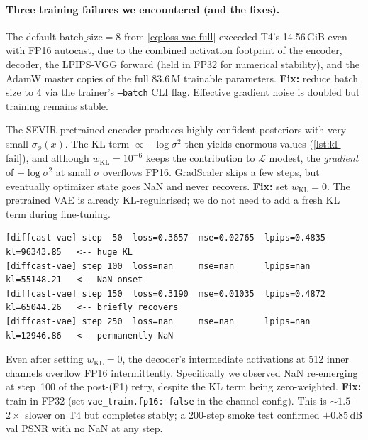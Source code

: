 \documentclass[11pt,a4paper]{article}
\begin{document}
\paragraph{Three training failures we encountered (and the fixes).}

\begin{description}[leftmargin=*]
\item[(F0) Out-of-memory on T4 at batch size 8.]  The default
  $\mathrm{batch\_size}=8$ from \cref{eq:loss-vae-full} exceeded T4's
  14.56\,GiB even with FP16 autocast, due to the combined activation
  footprint of the encoder, decoder, the LPIPS-VGG forward (held in FP32
  for numerical stability), and the AdamW master copies of the full 83.6\,M
  trainable parameters. \textbf{Fix:} reduce batch size to 4 via the
  trainer's \texttt{--batch} CLI flag. Effective gradient noise is doubled
  but training remains stable.

\item[(F1) KL-gradient overflow under FP16 ($w_{\mathrm{KL}}\!=\!10^{-6}$).]
  The {SEVIR}-pretrained encoder produces highly confident posteriors with
  very small $\sigma_\phi(x)$. The KL term
  $\propto -\log\sigma^2$ then yields enormous values (\cref{lst:kl-fail}),
  and although $w_{\mathrm{KL}}\!=\!10^{-6}$ keeps the contribution to
  $\mathcal L$ modest, the \emph{gradient} of $-\log\sigma^2$ at small
  $\sigma$ overflows FP16. GradScaler skips a few steps, but eventually
  optimizer state goes NaN and never recovers. \textbf{Fix:} set
  $w_{\mathrm{KL}}=0$. The pretrained VAE is already KL-regularised; we
  do not need to add a fresh KL term during fine-tuning.

\begin{lstlisting}[basicstyle=\ttfamily\scriptsize,
                   frame=single, caption={Actual training log
                   showing the KL-overflow failure pattern.},
                   label=lst:kl-fail, captionpos=b]
[diffcast-vae] step  50  loss=0.3657  mse=0.02765  lpips=0.4835  kl=96343.85   <-- huge KL
[diffcast-vae] step 100  loss=nan     mse=nan      lpips=nan     kl=55148.21   <-- NaN onset
[diffcast-vae] step 150  loss=0.3190  mse=0.01035  lpips=0.4872  kl=65044.26   <-- briefly recovers
[diffcast-vae] step 250  loss=nan     mse=nan      lpips=nan     kl=12946.86   <-- permanently NaN
\end{lstlisting}

\item[(F2) FP16 decoder activation overflow on T4 (even with $w_{\mathrm{KL}}=0$).]
  Even after setting $w_{\mathrm{KL}}=0$, the decoder's intermediate
  activations at 512 inner channels overflow FP16 intermittently. Specifically
  we observed NaN re-emerging at step~100 of the post-(F1) retry, despite the
  KL term being zero-weighted. \textbf{Fix:} train in FP32 (set
  \texttt{vae\_train.fp16: false} in the channel config). This is
  $\sim 1.5$-$2\times$ slower on T4 but completes stably; a 200-step smoke
  test confirmed $+0.85$\,dB val PSNR with no NaN at any step.
\end{description}
\end{document}
